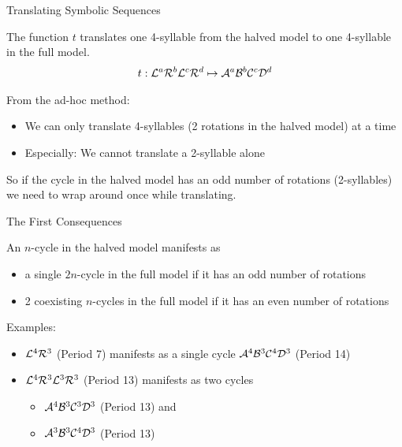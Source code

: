 \begin{frame}{Translating Symbolic Sequences}
	\begin{definition}
		The function $t$ translates one 4-syllable from the halved model to one 4-syllable in the full model.
		\begin{align*}
			t: \mathcal{L}^a\mathcal{R}^b\mathcal{L}^c\mathcal{R}^d \mapsto \mathcal{A}^a\mathcal{B}^b\mathcal{C}^c\mathcal{D}^d
		\end{align*}
	\end{definition}

	\pause
	From the ad-hoc method:
	\pause
	\begin{itemize}
		\item We can only translate 4-syllables (2 rotations in the halved model) at a time \pause
		\item Especially: We cannot translate a 2-syllable alone
	\end{itemize}
	\pause
	So if the cycle in the halved model has an odd number of rotations (2-syllables) we need to wrap around once while translating.
\end{frame}

\begin{frame}{The First Consequences}
	\begin{theorem}
		An $n$-cycle in the halved model manifests as
		\begin{itemize}
			\item a single $2n$-cycle in the full model if it has an odd number of rotations
			\item 2 coexisting $n$-cycles in the full model if it has an even number of rotations
		\end{itemize}
	\end{theorem}
	\pause
	Examples:
	\begin{itemize}
		\item $\mathcal{L}^4\mathcal{R}^3$ (Period 7) manifests as a single cycle $\mathcal{A}^4\mathcal{B}^3\mathcal{C}^4\mathcal{D}^3$ (Period 14)
		\item $\mathcal{L}^4\mathcal{R}^3\mathcal{L}^3\mathcal{R}^3$ (Period 13) manifests as two cycles
		      \begin{itemize}
			      \item $\mathcal{A}^4\mathcal{B}^3\mathcal{C}^3\mathcal{D}^3$ (Period 13) and
			      \item $\mathcal{A}^3\mathcal{B}^3\mathcal{C}^4\mathcal{D}^3$ (Period 13)
		      \end{itemize}
	\end{itemize}
\end{frame}

